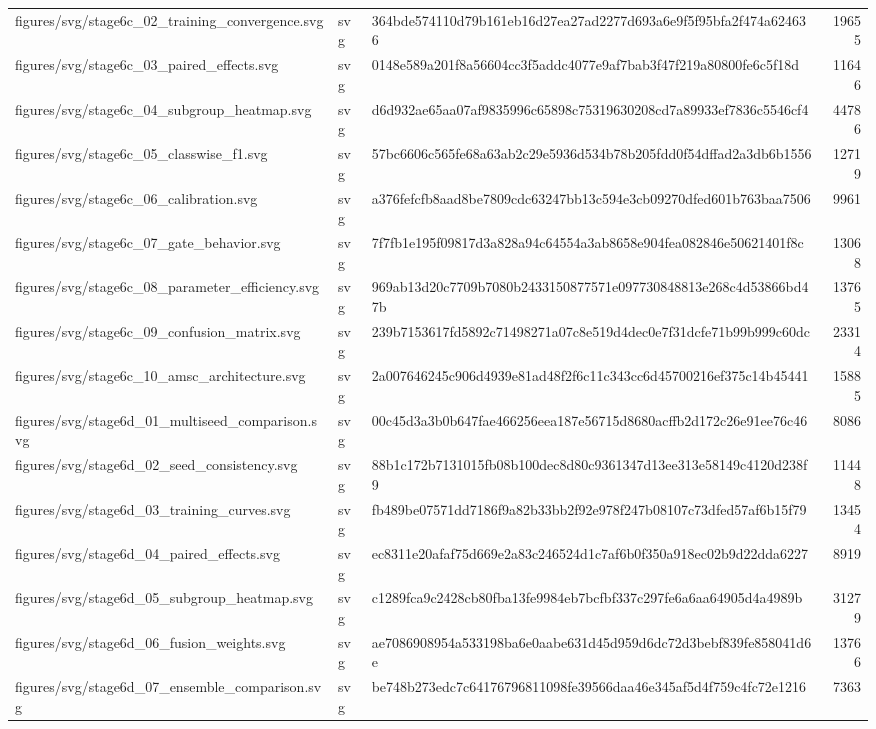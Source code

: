 \begin{tabular}{lllr}
figures/svg/stage6c_02_training_convergence.svg & svg & 364bde574110d79b161eb16d27ea27ad2277d693a6e9f5f95bfa2f474a624636 & 19655 \\
figures/svg/stage6c_03_paired_effects.svg & svg & 0148e589a201f8a56604cc3f5addc4077e9af7bab3f47f219a80800fe6c5f18d & 11646 \\
figures/svg/stage6c_04_subgroup_heatmap.svg & svg & d6d932ae65aa07af9835996c65898c75319630208cd7a89933ef7836c5546cf4 & 44786 \\
figures/svg/stage6c_05_classwise_f1.svg & svg & 57bc6606c565fe68a63ab2c29e5936d534b78b205fdd0f54dffad2a3db6b1556 & 12719 \\
figures/svg/stage6c_06_calibration.svg & svg & a376fefcfb8aad8be7809cdc63247bb13c594e3cb09270dfed601b763baa7506 & 9961 \\
figures/svg/stage6c_07_gate_behavior.svg & svg & 7f7fb1e195f09817d3a828a94c64554a3ab8658e904fea082846e50621401f8c & 13068 \\
figures/svg/stage6c_08_parameter_efficiency.svg & svg & 969ab13d20c7709b7080b2433150877571e097730848813e268c4d53866bd47b & 13765 \\
figures/svg/stage6c_09_confusion_matrix.svg & svg & 239b7153617fd5892c71498271a07c8e519d4dec0e7f31dcfe71b99b999c60dc & 23314 \\
figures/svg/stage6c_10_amsc_architecture.svg & svg & 2a007646245c906d4939e81ad48f2f6c11c343cc6d45700216ef375c14b45441 & 15885 \\
figures/svg/stage6d_01_multiseed_comparison.svg & svg & 00c45d3a3b0b647fae466256eea187e56715d8680acffb2d172c26e91ee76c46 & 8086 \\
figures/svg/stage6d_02_seed_consistency.svg & svg & 88b1c172b7131015fb08b100dec8d80c9361347d13ee313e58149c4120d238f9 & 11448 \\
figures/svg/stage6d_03_training_curves.svg & svg & fb489be07571dd7186f9a82b33bb2f92e978f247b08107c73dfed57af6b15f79 & 13454 \\
figures/svg/stage6d_04_paired_effects.svg & svg & ec8311e20afaf75d669e2a83c246524d1c7af6b0f350a918ec02b9d22dda6227 & 8919 \\
figures/svg/stage6d_05_subgroup_heatmap.svg & svg & c1289fca9c2428cb80fba13fe9984eb7bcfbf337c297fe6a6aa64905d4a4989b & 31279 \\
figures/svg/stage6d_06_fusion_weights.svg & svg & ae7086908954a533198ba6e0aabe631d45d959d6dc72d3bebf839fe858041d6e & 13766 \\
figures/svg/stage6d_07_ensemble_comparison.svg & svg & be748b273edc7c64176796811098fe39566daa46e345af5d4f759c4fc72e1216 & 7363 \\

\end{tabular}
